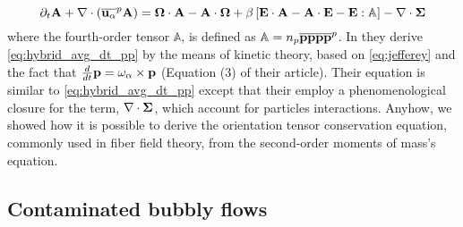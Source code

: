 \begin{equation}
    \partial_t \textbf{A}
    + \mathbf{\nabla} \cdot (
        \overline{\textbf{u}_\alpha}^{p}\textbf{A}
    )
    =
    \mathbf{\Omega} \cdot \textbf{A}
    - \textbf{A} \cdot \mathbf{\Omega}
    + \beta\left[
        \textbf{E} \cdot \textbf{A}
        -\textbf{A} \cdot \textbf{E}
        - \textbf{E} : \mathbb{A}
    \right]
    - \mathbf{\nabla} \cdot \mathbf{\Sigma}
    \label{eq:hybrid_avg_dt_pp}
\end{equation}
where the fourth-order tensor $\mathbb{A}$, is defined as $\mathbb{A} = n_p\overline{\textbf{pppp}}^{p}$.
In \citet{wang2008objective} they derive \ref{eq:hybrid_avg_dt_pp} by the means of kinetic theory, based on \ref{eq:jefferey} and the fact that $\frac{d}{d t} \textbf{p} = \omega_\alpha \times \textbf{p}$ (Equation (3) of their article).
Their equation is similar to \ref{eq:hybrid_avg_dt_pp} except that their employ a phenomenological closure for the term, $\mathbf{\nabla} \cdot \mathbf{\Sigma}$, which account for particles interactions.
Anyhow, we showed how it is possible to derive the orientation tensor conservation equation, commonly used in fiber field theory, from the second-order moments of mass's equation. 

\subsection{Contaminated bubbly flows}

